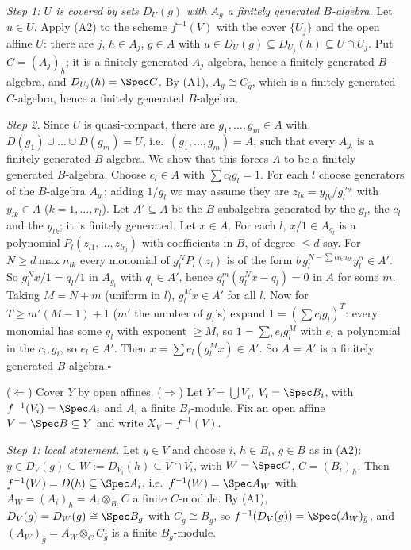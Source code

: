 \documentclass[11pt]{article}
\begin{document}
\emph{Step 1: $U$ is covered by sets $D_U(g)$ with $A_g$ a finitely generated $B$-algebra.} Let $u\in U$. Apply (A2) to the scheme $f^{-1}(V)$ with the cover $\{U_j\}$ and the open affine $U$: there are $j$, $h\in A_j$, $g\in A$ with $u\in D_U(g)\subseteq D_{U_j}(h)\subseteq U\cap U_j$. Put $C=(A_j)_h$; it is a finitely generated $A_j$-algebra, hence a finitely generated $B$-algebra, and $D_{U_j}(h)=\Spec C$. By (A1), $A_g\cong C_{\bar g}$, which is a finitely generated $C$-algebra, hence a finitely generated $B$-algebra.

\emph{Step 2.} Since $U$ is quasi-compact, there are $g_1,\dots,g_m\in A$ with $D(g_1)\cup\dots\cup D(g_m)=U$, i.e.\ $(g_1,\dots,g_m)=A$, such that every $A_{g_l}$ is a finitely generated $B$-algebra. We show that this forces $A$ to be a finitely generated $B$-algebra. Choose $c_l\in A$ with $\sum c_lg_l=1$. For each $l$ choose generators of the $B$-algebra $A_{g_l}$; adding $1/g_l$ we may assume they are $z_{lk}=y_{lk}/g_l^{n_{lk}}$ with $y_{lk}\in A$ ($k=1,\dots,r_l$). Let $A'\subseteq A$ be the $B$-subalgebra generated by the $g_l$, the $c_l$ and the $y_{lk}$; it is finitely generated. Let $x\in A$. For each $l$, $x/1\in A_{g_l}$ is a polynomial $P_l(z_{l1},\dots,z_{lr_l})$ with coefficients in $B$, of degree $\le d$ say. For $N\ge d\max n_{lk}$ every monomial of $g_l^NP_l(z_l)$ is of the form $b\,g_l^{N-\sum\alpha_kn_{lk}}y_l^\alpha\in A'$. So $g_l^Nx/1=q_l/1$ in $A_{g_l}$ with $q_l\in A'$, hence $g_l^{m}(g_l^Nx-q_l)=0$ in $A$ for some $m$. Taking $M=N+m$ (uniform in $l$), $g_l^Mx\in A'$ for all $l$. Now for $T\ge m'(M-1)+1$ ($m'$ the number of $g_l$'s) expand $1=(\sum c_lg_l)^T$: every monomial has some $g_l$ with exponent $\ge M$, so $1=\sum_le_lg_l^M$ with $e_l$ a polynomial in the $c_i,g_i$, so $e_l\in A'$. Then $x=\sum e_l(g_l^Mx)\in A'$. So $A=A'$ is a finitely generated $B$-algebra.\hfill$\square$

\pf
($\Leftarrow$) Cover $Y$ by open affines. ($\Rightarrow$) Let $Y=\bigcup V_i$, $V_i=\Spec B_i$, with $f^{-1}(V_i)=\Spec A_i$ and $A_i$ a finite $B_i$-module. Fix an open affine $V=\Spec B\subseteq Y$ and write $X_V=f^{-1}(V)$.

\emph{Step 1: local statement.} Let $y\in V$ and choose $i$, $h\in B_i$, $g\in B$ as in (A2): $y\in D_V(g)\subseteq W:=D_{V_i}(h)\subseteq V\cap V_i$, with $W=\Spec C$, $C=(B_i)_h$. Then $f^{-1}(W)=D(h)\subseteq\Spec A_i$, i.e.\ $f^{-1}(W)=\Spec A_W$ with $A_W=(A_i)_h=A_i\otimes_{B_i}C$ a finite $C$-module. By (A1), $D_V(g)=D_W(\bar g)\cong\Spec B_g$ with $C_{\bar g}\cong B_g$, so $f^{-1}(D_V(g))=\Spec (A_W)_{\bar g}$, and $(A_W)_{\bar g}=A_W\otimes_CC_{\bar g}$ is a finite $B_g$-module.
\end{document}
